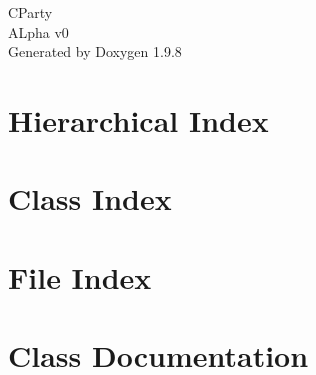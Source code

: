 \documentclass[twoside]{book}
\newcommand{\+}{\discretionary{\mbox{\scriptsize$\hookleftarrow$}}{}{}}
\newcommand{\clearemptydoublepage}{%
    \newpage{\pagestyle{empty}\cleardoublepage}%
  }
\begin{document}
  \raggedbottom
    \hypersetup{pageanchor=false,
                bookmarksnumbered=true,
                pdfencoding=unicode
               }
  \begin{titlepage}
  \vspace*{7cm}
  \begin{center}%
  {\Large CParty}\\
  [1ex]\large ALpha v0 \\
  \vspace*{1cm}
  {\large Generated by Doxygen 1.9.8}\\
  \end{center}
  \end{titlepage}
  \clearemptydoublepage
  \tableofcontents
  \clearemptydoublepage
  \hypersetup{pageanchor=true}

\chapter{Hierarchical Index}

\chapter{Class Index}

\chapter{File Index}

\chapter{Class Documentation}


























\end{document}
